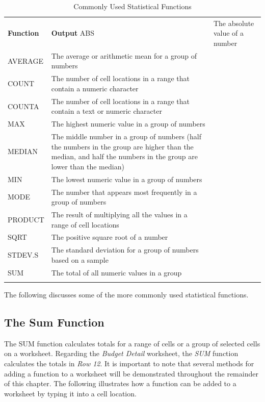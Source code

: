 \begin{table}[H]
	{\small
		\begin{longtable}{L{0.75in}L{3.50in}} %
			\textbf{Function} & \textbf{Output} \endhead
			\hline
			ABS & The absolute value of a number\\
			AVERAGE & The average or arithmetic mean for a group of numbers\\
			COUNT & The number of cell locations in a range that contain a numeric character\\
			COUNTA & The number of cell locations in a range that contain a text or numeric character\\
			MAX & The highest numeric value in a group of numbers\\
			MEDIAN & The middle number in a group of numbers (half the numbers in the group are higher than the median, and half the numbers in the group are lower than the median)\\
			MIN & The lowest numeric value in a group of numbers\\
			MODE & The number that appears most frequently in a group of numbers\\
			PRODUCT & The result of multiplying all the values in a range of cell locations\\
			SQRT & The positive square root of a number\\
			STDEV.S & The standard deviation for a group of numbers based on a sample\\
			SUM & The total of all numeric values in a group\\
			\caption{Commonly Used Statistical Functions}
			\label{02:tab04}
		\end{longtable}
	} %
\end{table}

The following discusses some of the more commonly used statistical functions.

\subsection{The Sum Function}

The SUM function calculates totals for a range of cells or a group of selected cells on a worksheet. Regarding the \textit{Budget Detail} worksheet, the \textit{SUM} function calculates the totals in \textit{Row 12}. It is important to note that several methods for adding a function to a worksheet will be demonstrated throughout the remainder of this chapter. The following illustrates how a function can be added to a worksheet by typing it into a cell location.

